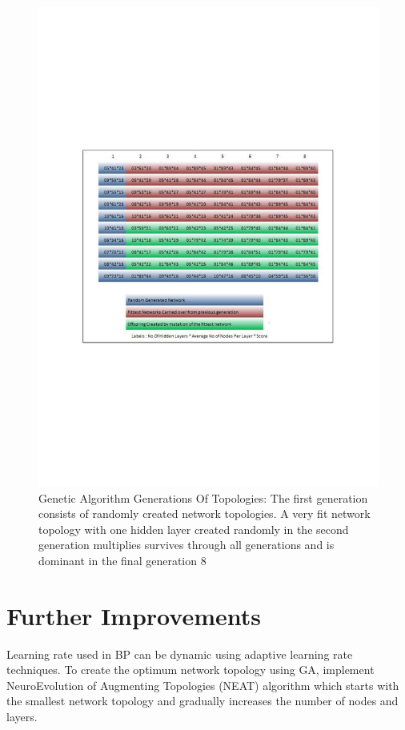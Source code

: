 \begin{figure}[h]
\centering
   \includegraphics[scale=.7]{figures/generations.pdf}
  \caption[Genetic Algorithm Generations Of Topologies]{Genetic Algorithm Generations Of Topologies: The first generation consists of randomly created network topologies. A very fit network topology with one hidden layer created randomly in the second generation multiplies survives through all generations and is dominant in the final generation 8} 
 \label{fig:Gagen}
\end{figure}

\section{Further Improvements}
Learning rate used in BP can be dynamic using adaptive learning rate techniques. To create the optimum network topology using GA, implement NeuroEvolution of Augmenting Topologies (NEAT) algorithm  \cite{K2002}  which starts with the smallest network topology and gradually increases the number of nodes and layers.

